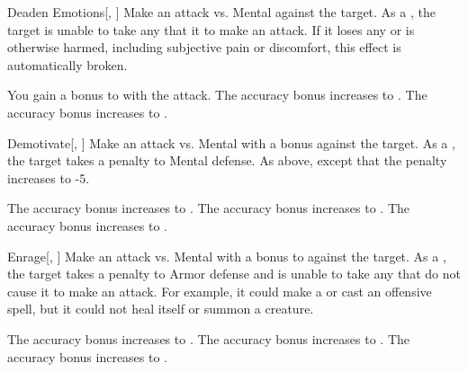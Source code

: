 \lowercase{\hypertarget{spell:Deaden Emotions}{}}\label{spell:Deaden Emotions}
\begin{freeability}[Rank 2]{\hypertarget{spell:Deaden Emotions}{Deaden Emotions}}[, ]
Make an attack vs. Mental against the target.
\hit As a , the target is unable to take any  that it to make an attack.
If it loses any  or is otherwise harmed, including subjective pain or discomfort, this effect is automatically broken.

\rankline
{} You gain a  bonus to  with the attack.
 The accuracy bonus increases to .
 The accuracy bonus increases to .
\end{freeability}
\vspace{0.25em}



\lowercase{\hypertarget{spell:Demotivate}{}}\label{spell:Demotivate}
\begin{freeability}[Rank 2]{\hypertarget{spell:Demotivate}{Demotivate}}[, ]
Make an attack vs. Mental with a  bonus against the target.
\hit As a , the target takes a  penalty to Mental defense.
\crit As above, except that the penalty increases to -5.

\rankline
{} The accuracy bonus increases to .
 The accuracy bonus increases to .
 The accuracy bonus increases to .
\end{freeability}
\vspace{0.25em}



\lowercase{\hypertarget{spell:Enrage}{}}\label{spell:Enrage}
\begin{freeability}[Rank 2]{\hypertarget{spell:Enrage}{Enrage}}[, ]
Make an attack vs. Mental with a  bonus to  against the target.
\hit As a , the target takes a  penalty to Armor defense and is unable to take any  that do not cause it to make an attack.
For example, it could make a  or cast an offensive spell, but it could not heal itself or summon a creature.

\rankline
{} The accuracy bonus increases to .
 The accuracy bonus increases to .
 The accuracy bonus increases to .
\end{freeability}
\vspace{0.25em}



